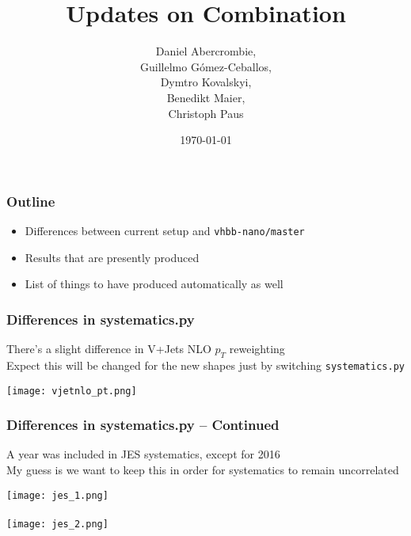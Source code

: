 \documentclass{beamer}
\author[D. Abercrombie]{
  Daniel Abercrombie, \\
  Guillelmo G\'omez-Ceballos, \\
  Dymtro Kovalskyi, \\
  Benedikt Maier, \\
  Christoph Paus
}
\title{\bf \sffamily Updates on Combination}
\date{\today}
\begin{document}
\begin{frame}
  \titlepage
\end{frame}

\begin{frame}
  \frametitle{Outline}

  \begin{itemize}
  \item Differences between current setup and \texttt{vhbb-nano/master}
  \item Results that are presently produced
  \item List of things to have produced automatically as well
  \end{itemize}

\end{frame}

\begin{frame}
  \frametitle{Differences in systematics.py}

  There's a slight difference in V+Jets NLO $p_T$ reweighting \\
  Expect this will be changed for the new shapes just by switching \texttt{systematics.py}

  \vfill

  \centering
  \texttt{[image: vjetnlo\_pt.png]}

\end{frame}

\begin{frame}
  \frametitle{Differences in systematics.py -- Continued}

  A year was included in JES systematics, except for 2016 \\
  My guess is we want to keep this in order for systematics to remain uncorrelated

  \vfill

  \centering
  \texttt{[image: jes\_1.png]} \\
  \cdots \\
  \texttt{[image: jes\_2.png]} \\
  \cdots

\end{frame}
\end{document}
